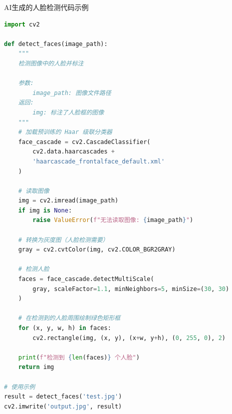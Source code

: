 \begin{frame}[fragile]{AI生成的人脸检测代码示例}
	\begin{lstlisting}[language=Python, basicstyle=\ttfamily\footnotesize]
import cv2

def detect_faces(image_path):
    """
    检测图像中的人脸并标注
    
    参数:
        image_path: 图像文件路径
    返回:
        img: 标注了人脸框的图像
    """
    # 加载预训练的 Haar 级联分类器
    face_cascade = cv2.CascadeClassifier(
        cv2.data.haarcascades + 
        'haarcascade_frontalface_default.xml'
    )
    
    # 读取图像
    img = cv2.imread(image_path)
    if img is None:
        raise ValueError(f"无法读取图像: {image_path}")
    
    # 转换为灰度图（人脸检测需要）
    gray = cv2.cvtColor(img, cv2.COLOR_BGR2GRAY)
    
    # 检测人脸
    faces = face_cascade.detectMultiScale(
        gray, scaleFactor=1.1, minNeighbors=5, minSize=(30, 30)
    )
    
    # 在检测到的人脸周围绘制绿色矩形框
    for (x, y, w, h) in faces:
        cv2.rectangle(img, (x, y), (x+w, y+h), (0, 255, 0), 2)
    
    print(f"检测到 {len(faces)} 个人脸")
    return img

# 使用示例
result = detect_faces('test.jpg')
cv2.imwrite('output.jpg', result)
\end{lstlisting}
\end{frame}
